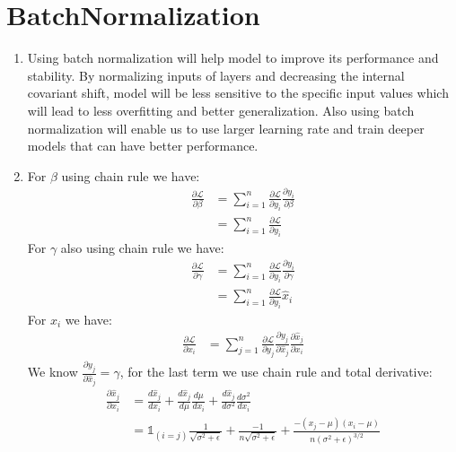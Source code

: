 \documentclass[12]{article}
\newcommand{\myskip}{0.7em}
\begin{document}
	\pagebreak
	\section{BatchNormalization}
	\begin{enumerate}[label=\textbf{(\alph*)}]
		\item
		Using batch normalization will help model to improve its performance and stability. By normalizing inputs of layers and decreasing the internal covariant shift, model will be less sensitive to the specific input values which will lead to less overfitting and better generalization. Also using batch normalization will enable us to use larger learning rate and train deeper models that can have better performance.
		\item
		For $\beta$ using chain rule we have:
		\[
		\begin{aligned}
			\frac{\partial \mathcal{L}}{\partial \beta} &= \sum_{i=1}^{n} \frac{\partial \mathcal{L}}{\partial y_i} \frac{\partial y_i}{\partial \beta} \\[\myskip]
				&= \boxed{\sum_{i=1}^{n} \frac{\partial \mathcal{L}}{\partial y_i}}
		\end{aligned}
		\]
		For $\gamma$ also using chain rule we have:
		\[
		\begin{aligned}
			\frac{\partial \mathcal{L}}{\partial \gamma} &= \sum_{i=1}^{n} \frac{\partial \mathcal{L}}{\partial y_i} \frac{\partial y_i}{\partial \gamma} \\[\myskip]
				&= \boxed{\sum_{i=1}^n \frac{\partial \mathcal{L}}{\partial y_i} \hat{x}_i}
		\end{aligned}
		\]
		For $x_i$ we have:
		\[
		\begin{aligned}
			\frac{\partial \mathcal{L}}{\partial x_i} &= \sum_{j=1}^{n} \frac{\partial \mathcal{L}}{\partial y_j} \frac{\partial y_j}{\partial \hat{x}_j} \frac{\partial \hat{x}_j}{\partial x_i}
		\end{aligned}
		\]
		We know $\frac{\partial y_j}{\partial \hat{x}_j} = \gamma$, for the last term we use chain rule and total derivative:
		\[
		\begin{aligned}
			\frac{\partial \hat{x}_j}{\partial x_i} &= \frac{d \hat{x}_j}{dx_i} + \frac{d\hat{x}_j}{d\mu}\frac{d\mu}{dx_i} + \frac{d\hat{x}_j}{d\sigma^2}\frac{d\sigma^2}{dx_i} \\[\myskip]
				&= \mathds{1}_{(i=j)}\frac{1}{\sqrt{\sigma^2+\epsilon}} + \frac{-1}{n\sqrt{\sigma^2+\epsilon}} + \frac{-(x_j - \mu)(x_i-\mu)}{n(\sigma^2 + \epsilon)^{3/2}}
		\end{aligned}
\]
\end{enumerate}
\end{document}
